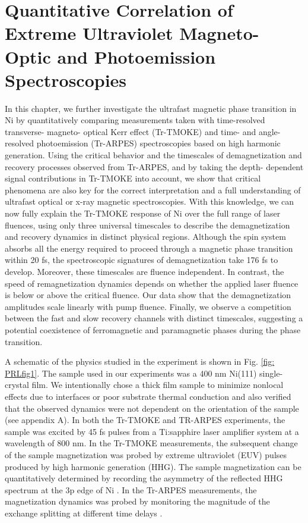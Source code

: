 \chapter{Quantitative Correlation of Extreme Ultraviolet Magneto-Optic and Photoemission Spectroscopies}
\label{PRLchap}
In this chapter, we further investigate the ultrafast magnetic phase transition in Ni by quantitatively comparing measurements taken with time-resolved transverse- magneto- optical Kerr effect (Tr-TMOKE) and time- and angle- resolved photoemission (Tr-ARPES) spectroscopies based on high harmonic generation. Using the critical behavior and the timescales of demagnetization and recovery processes observed from Tr-ARPES, and by taking the depth- dependent signal contributions in Tr-TMOKE into account, we show that critical phenomena are also key for the correct interpretation and a full understanding of ultrafast optical or x-ray magnetic spectroscopies. With this knowledge, we can now fully explain the Tr-TMOKE response of Ni over the full range of laser fluences, using only three universal timescales to describe the demagnetization and recovery dynamics in distinct physical regions. Although the spin system absorbs all the energy required to proceed through a magnetic phase transition within 20 fs, the spectroscopic signatures of demagnetization take 176 fs to develop. Moreover, these timescales are fluence independent. In contrast, the speed of remagnetization dynamics depends on whether the applied laser fluence is below or above the critical fluence. Our data show that the demagnetization amplitudes scale linearly with pump fluence. Finally, we observe a competition between the fast and slow recovery channels with distinct timescales, suggesting a potential coexistence of ferromagnetic and paramagnetic phases during the phase transition.

A schematic of the physics studied in the experiment is shown in Fig. \ref{fig: PRLfig1}. The sample used in our experiments was a 400 nm Ni(111) single-crystal film. We intentionally chose a thick film sample to minimize nonlocal effects due to interfaces or poor substrate thermal conduction \cite{Turgut2013,Rudolf2012} and also verified that the observed dynamics were not dependent on the orientation of the sample (see appendix A). In both the Tr-TMOKE and TR-ARPES experiments, the sample was excited by 45 fs pulses from a Ti:sapphire laser amplifier system at a wavelength of 800 nm. In the Tr-TMOKE measurements, the subsequent change of the sample magnetization was probed by extreme ultraviolet (EUV) pulses produced by high harmonic generation (HHG). The sample magnetization can be quantitatively determined by recording the asymmetry of the reflected HHG spectrum at the 3p edge of Ni \cite{La-O-Vorakiat2009,Mathias2012,Turgut2016}. In the Tr-ARPES measurements, the magnetization dynamics was probed by monitoring the magnitude of the exchange splitting at different time delays \cite{Carley2012,Rhie2003,Tengdin2018}.

